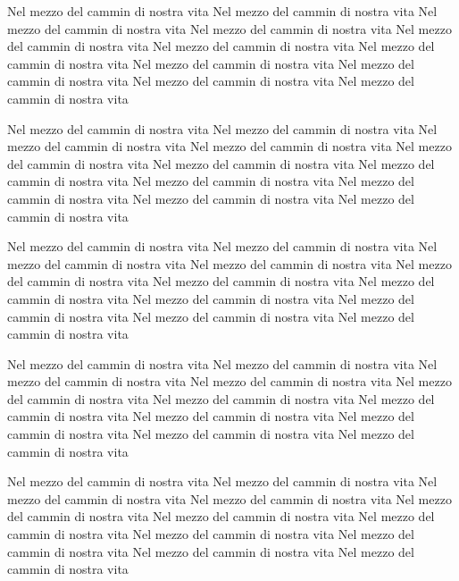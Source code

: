 \documentclass[11pt,a4paper,twoside]{book}
\begin{document}
\pstart\label{6}%
%
%
Nel mezzo del cammin di nostra vita Nel mezzo del cammin di nostra vita Nel mezzo del cammin di nostra vita Nel mezzo del cammin di nostra vita Nel mezzo del cammin di nostra vita Nel mezzo del cammin di nostra vita Nel mezzo del cammin di nostra vita Nel mezzo del cammin di nostra vita Nel mezzo del cammin di nostra vita Nel mezzo del cammin di nostra vita Nel mezzo del cammin di nostra vita 
\pend

\pstart\label{7}%
%
%
Nel mezzo del cammin di nostra vita Nel mezzo del cammin di nostra vita Nel mezzo del cammin di nostra vita Nel mezzo del cammin di nostra vita Nel mezzo del cammin di nostra vita Nel mezzo del cammin di nostra vita Nel mezzo del cammin di nostra vita Nel mezzo del cammin di nostra vita Nel mezzo del cammin di nostra vita Nel mezzo del cammin di nostra vita Nel mezzo del cammin di nostra vita 
\pend

\pstart\label{8}%
%
%
Nel mezzo del cammin di nostra vita Nel mezzo del cammin di nostra vita Nel mezzo del cammin di nostra vita Nel mezzo del cammin di nostra vita Nel mezzo del cammin di nostra vita Nel mezzo del cammin di nostra vita Nel mezzo del cammin di nostra vita Nel mezzo del cammin di nostra vita Nel mezzo del cammin di nostra vita Nel mezzo del cammin di nostra vita Nel mezzo del cammin di nostra vita 
\pend

\pstart\label{9}%
%
%
Nel mezzo del cammin di nostra vita Nel mezzo del cammin di nostra vita Nel mezzo del cammin di nostra vita Nel mezzo del cammin di nostra vita Nel mezzo del cammin di nostra vita Nel mezzo del cammin di nostra vita Nel mezzo del cammin di nostra vita Nel mezzo del cammin di nostra vita Nel mezzo del cammin di nostra vita Nel mezzo del cammin di nostra vita Nel mezzo del cammin di nostra vita 
\pend

\pstart\label{10}%
%
%
Nel mezzo del cammin di nostra vita Nel mezzo del cammin di nostra vita Nel mezzo del cammin di nostra vita Nel mezzo del cammin di nostra vita Nel mezzo del cammin di nostra vita Nel mezzo del cammin di nostra vita Nel mezzo del cammin di nostra vita Nel mezzo del cammin di nostra vita Nel mezzo del cammin di nostra vita Nel mezzo del cammin di nostra vita Nel mezzo del cammin di nostra vita 
\pend
\end{document}
